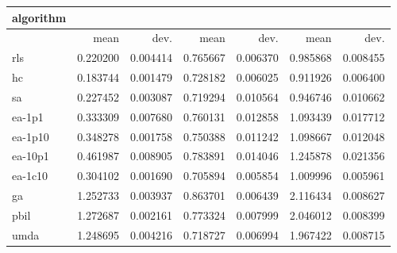 \begin{tabular}{@{}l*{6}{>{{}}N{1}{2}}@{}}
\toprule
{algorithm} &  &  &  \\
\midrule
& {mean} & {dev.} & {mean} & {dev.} & {mean} & {dev.} \\
\midrule
rls & 0.220200 & 0.004414 & 0.765667 & 0.006370 & 0.985868 & 0.008455 \\
 hc & 0.183744 & 0.001479 & 0.728182 & 0.006025 & 0.911926 & 0.006400 \\
 sa & 0.227452 & 0.003087 & 0.719294 & 0.010564 & 0.946746 & 0.010662 \\
 ea-1p1 & 0.333309 & 0.007680 & 0.760131 & 0.012858 & 1.093439 & 0.017712 \\
 ea-1p10 & 0.348278 & 0.001758 & 0.750388 & 0.011242 & 1.098667 & 0.012048 \\
 ea-10p1 & 0.461987 & 0.008905 & 0.783891 & 0.014046 & 1.245878 & 0.021356 \\
 ea-1c10 & 0.304102 & 0.001690 & 0.705894 & 0.005854 & 1.009996 & 0.005961 \\
 ga & 1.252733 & 0.003937 & 0.863701 & 0.006439 & 2.116434 & 0.008627 \\
 pbil & 1.272687 & 0.002161 & 0.773324 & 0.007999 & 2.046012 & 0.008399 \\
 umda & 1.248695 & 0.004216 & 0.718727 & 0.006994 & 1.967422 & 0.008715 \\
 \bottomrule
\end{tabular}
